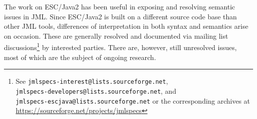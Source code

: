 \documentclass{llncs}
\begin{document}
The work on ESC/Java2 has been useful in exposing and resolving
semantic issues in JML.  Since ESC/Java2 is built on a different
source code base than other JML tools, differences of interpretation
in both syntax and semantics arise on occasion.  These are generally
resolved and documented via mailing list discussions\footnote{See
  \texttt{jmlspecs-interest@lists.sourceforge.net},\\
  \texttt{jmlspecs-developers@lists.sourceforge.net}, and \\
  \texttt{jmlspecs-escjava@lists.sourceforge.net} or the corresponding
  archives at \url{https://sourceforge.net/projects/jmlspecs}} by
interested parties.  There are, however, still unresolved issues, most
of which are the subject of ongoing research.
\setlength{\partopsep}{0in}\setlength{\parskip}{0in}\setlength{\itemsep}{0in}\setlength{\topsep}{0in}
\end{document}
